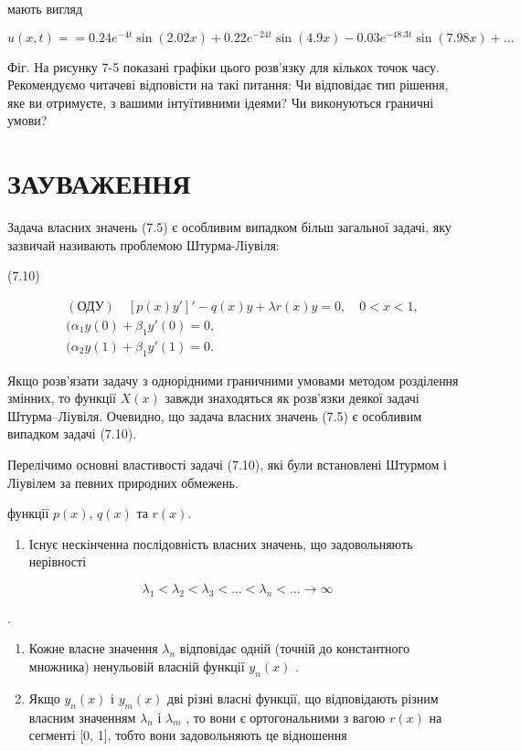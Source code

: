 \documentclass[
  ukrainian,
]{article}
\providecommand{\tightlist}{%
  \setlength{\itemsep}{0pt}\setlength{\parskip}{0pt}}
\begin{document}
мають вигляд

\[
u(x, t) = = 0.24e^{-4t} \sin(2.02x) + 0.22e^{-24t} \sin(4.9x) - 0.03e^{-48.3t} \sin(7.98x) + \dots
\]

Фіг. На рисунку 7-5 показані графіки цього розв'язку для кількох точок
часу. Рекомендуємо читачеві відповісти на такі питання: Чи відповідає
тип рішення, яке ви отримуєте, з вашими інтуїтивними ідеями? Чи
виконуються граничні умови?

\section{ЗАУВАЖЕННЯ}\label{ux437ux430ux443ux432ux430ux436ux435ux43dux43dux44f-5}

Задача власних значень (7.5) є особливим випадком більш загальної
задачі, яку зазвичай називають проблемою Штурма-Ліувіля:

(7.10)

\[
\begin{aligned} & (\text{ОДУ}) \quad [p(x)y']' - q(x)y + \lambda r(x)y = 0, \quad 0 < x < 1, \\ & (\alpha_1 y(0) + \beta_1 y'(0) = 0, \\ & (\alpha_2 y(1) + \beta_1 y'(1) = 0. \end{aligned}
\]

Якщо розв'язати задачу з однорідними граничними умовами методом
розділення змінних, то функції \(X(x)\) завжди знаходяться як розв'язки
деякої задачі Штурма--Ліувіля. Очевидно, що задача власних значень (7.5)
є особливим випадком задачі (7.10).

Перелічимо основні властивості задачі (7.10), які були встановлені
Штурмом і Ліувілем за певних природних обмежень.

функції \(p(x)\), \(q(x)\) та \(r(x)\).

\begin{enumerate}
\def\labelenumi{\arabic{enumi}.}
\tightlist
\item
  Існує нескінченна послідовність власних значень, що задовольняють
  нерівності
\end{enumerate}

\[
\lambda_1 < \lambda_2 < \lambda_3 < \ldots < \lambda_n < \ldots \to \infty
\]

.

\begin{enumerate}
\def\labelenumi{\arabic{enumi}.}
\setcounter{enumi}{1}
\item
  Кожне власне значення \(\lambda_n\) відповідає одній (точній до
  константного множника) ненульовій власній функції \(y_n(x)\) .
\item
  Якщо \(y_n(x)\) і \(y_m(x)\) дві різні власні функції, що відповідають
  різним власним значенням \(\lambda_n\) і \(\lambda_m\) , то вони є
  ортогональними з вагою \(r(x)\) на сегменті {[}0, 1{]}, тобто вони
  задовольняють це відношення
\end{enumerate}
\end{document}
